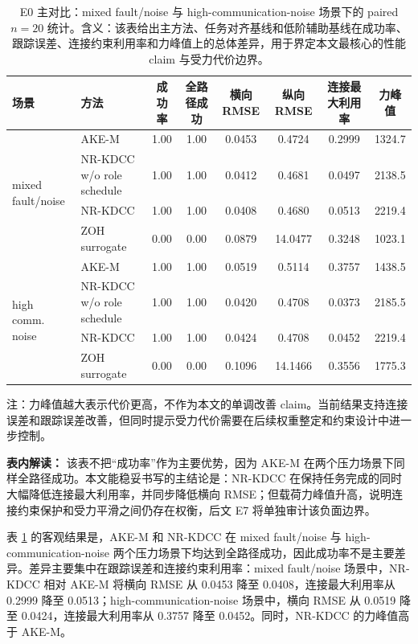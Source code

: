 \documentclass[twocolumn,3p,times,procedia]{elsarticle}
\newcommand{\AKE}{AKE-M}
\newcommand{\Method}{NR-KDCC}
\newcommand{\TF}{\Method{}}
\begin{document}
\begin{table}[!t]
\centering
\caption{E0 主对比：mixed fault/noise 与 high-communication-noise 场景下的 paired $n=20$ 统计。含义：该表给出主方法、任务对齐基线和低阶辅助基线在成功率、跟踪误差、连接约束利用率和力峰值上的总体差异，用于界定本文最核心的性能 claim 与受力代价边界。}
\label{tab:e0_main}
\footnotesize
\begin{tabular}{llcccccc}
\toprule
场景 & 方法 & 成功率 & 全路径成功 & 横向 RMSE & 纵向 RMSE & 连接最大利用率 & 力峰值 \\
\midrule
\multirow{4}{*}{mixed fault/noise}
& \AKE{} & 1.00 & 1.00 & 0.0453 & 0.4724 & 0.2999 & 1324.7\\
& \Method{} w/o role schedule & 1.00 & 1.00 & 0.0412 & 0.4681 & 0.0497 & 2138.5\\
& \TF{} & 1.00 & 1.00 & 0.0408 & 0.4680 & 0.0513 & 2219.4\\
& ZOH surrogate & 0.00 & 0.00 & 0.0879 & 14.0477 & 0.3248 & 1023.1\\
\midrule
\multirow{4}{*}{high comm. noise}
& \AKE{} & 1.00 & 1.00 & 0.0519 & 0.5114 & 0.3757 & 1438.5\\
& \Method{} w/o role schedule & 1.00 & 1.00 & 0.0420 & 0.4708 & 0.0373 & 2185.5\\
& \TF{} & 1.00 & 1.00 & 0.0424 & 0.4708 & 0.0452 & 2219.4\\
& ZOH surrogate & 0.00 & 0.00 & 0.1096 & 14.1466 & 0.3556 & 1775.3\\
\bottomrule
\end{tabular}
\begin{tablenotes}
\footnotesize
\item 注：力峰值越大表示代价更高，不作为本文的单调改善 claim。当前结果支持连接误差和跟踪误差改善，但同时提示受力代价需要在后续权重整定和约束设计中进一步控制。
\end{tablenotes}
\vspace{1.5mm}
\begin{minipage}{0.93\textwidth}
\footnotesize
\textbf{表内解读：} 该表不把“成功率”作为主要优势，因为 \AKE{} 在两个压力场景下同样全路径成功。本文能稳妥书写的主结论是：\Method{} 在保持任务完成的同时大幅降低连接最大利用率，并同步降低横向 RMSE；但载荷力峰值升高，说明连接约束保护和受力平滑之间仍存在权衡，后文 E7 将单独审计该负面边界。
\end{minipage}
\end{table}

表 \ref{tab:e0_main} 的客观结果是，\AKE{} 和 \Method{} 在 mixed fault/noise 与 high-communication-noise 两个压力场景下均达到全路径成功，因此成功率不是主要差异。差异主要集中在跟踪误差和连接约束利用率：mixed fault/noise 场景中，\Method{} 相对 \AKE{} 将横向 RMSE 从 0.0453 降至 0.0408，连接最大利用率从 0.2999 降至 0.0513；high-communication-noise 场景中，横向 RMSE 从 0.0519 降至 0.0424，连接最大利用率从 0.3757 降至 0.0452。同时，\Method{} 的力峰值高于 \AKE{}。
\end{document}
